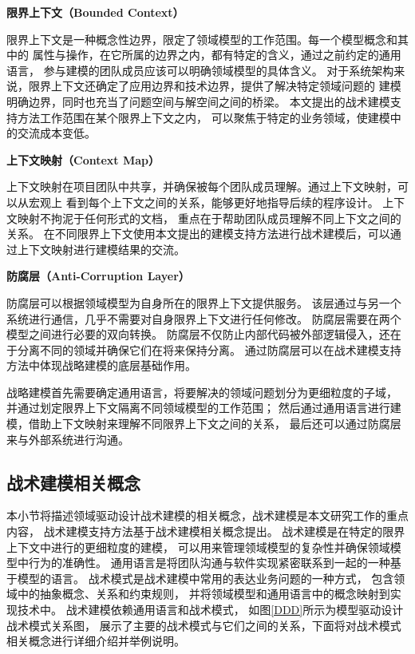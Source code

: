 \textbf{限界上下文（Bounded Context）}

限界上下文是一种概念性边界，限定了领域模型的工作范围。每一个模型概念和其中的
属性与操作，在它所属的边界之内，都有特定的含义，通过之前约定的通用语言，
参与建模的团队成员应该可以明确领域模型的具体含义。
对于系统架构来说，限界上下文还确定了应用边界和技术边界，提供了解决特定领域问题的
建模明确边界，同时也充当了问题空间与解空间之间的桥梁。
本文提出的战术建模支持方法工作范围在某个限界上下文之内，
可以聚焦于特定的业务领域，使建模中的交流成本变低。

\textbf{上下文映射（Context Map）}

上下文映射在项目团队中共享，并确保被每个团队成员理解。通过上下文映射，可以从宏观上
看到每个上下文之间的关系，能够更好地指导后续的程序设计。
上下文映射不拘泥于任何形式的文档，
重点在于帮助团队成员理解不同上下文之间的关系。
在不同限界上下文使用本文提出的建模支持方法进行战术建模后，可以通过上下文映射进行建模结果的交流。

\textbf{防腐层（Anti-Corruption Layer）}

防腐层可以根据领域模型为自身所在的限界上下文提供服务。
该层通过与另一个系统进行通信，几乎不需要对自身限界上下文进行任何修改。
防腐层需要在两个模型之间进行必要的双向转换\cite{DBLP:books/daglib/0013521}。
防腐层不仅防止内部代码被外部逻辑侵入，还在于分离不同的领域并确保它们在将来保持分离。
通过防腐层可以在战术建模支持方法中体现战略建模的底层基础作用。

战略建模首先需要确定通用语言，将要解决的领域问题划分为更细粒度的子域，
并通过划定限界上下文隔离不同领域模型的工作范围；
然后通过通用语言进行建模，借助上下文映射来理解不同限界上下文之间的关系，
最后还可以通过防腐层来与外部系统进行沟通。


\subsection{战术建模相关概念}

本小节将描述领域驱动设计战术建模的相关概念，战术建模是本文研究工作的重点内容，
战术建模支持方法基于战术建模相关概念提出。
战术建模是在特定的限界上下文中进行的更细粒度的建模，
可以用来管理领域模型的复杂性并确保领域模型中行为的准确性。
通用语言是将团队沟通与软件实现紧密联系到一起的一种基于模型的语言。
战术模式是战术建模中常用的表达业务问题的一种方式，
包含领域中的抽象概念、关系和约束规则，
并将领域模型和通用语言中的概念映射到实现技术中。
战术建模依赖通用语言和战术模式，
如图\ref{DDD}所示为模型驱动设计战术模式关系图，
展示了主要的战术模式与它们之间的关系，下面将对战术模式相关概念进行详细介绍并举例说明。

